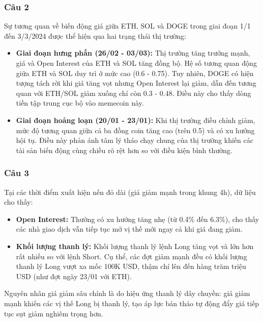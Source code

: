 \subsubsection{Câu 2}
Sự tương quan về biến động giá giữa ETH, SOL và DOGE trong giai đoạn 1/1 đến 3/3/2024 được thể hiện qua hai trạng thái thị trường:
\begin{itemize}
    \item \textbf{Giai đoạn hưng phấn (26/02 - 03/03):} Thị trường tăng trưởng mạnh, giá và Open Interest của ETH và SOL tăng đồng bộ. Hệ số tương quan động giữa ETH và SOL duy trì ở mức cao (0.6 - 0.75). Tuy nhiên, DOGE có hiện tượng tách rời khi giá tăng vọt nhưng Open Interest lại giảm, dẫn đến tương quan với ETH/SOL giảm xuống chỉ còn 0.3 - 0.48. Điều này cho thấy dòng tiền tập trung cục bộ vào memecoin này.
    \item \textbf{Giai đoạn hoảng loạn (20/01 - 23/01):} Khi thị trường điều chỉnh giảm, mức độ tương quan giữa cả ba đồng coin tăng cao (trên 0.5) và có xu hướng hội tụ. Điều này phản ánh tâm lý tháo chạy chung của thị trường khiến các tài sản biến động cùng chiều rõ rệt hơn so với điều kiện bình thường.
\end{itemize}

\subsubsection{Câu 3}
Tại các thời điểm xuất hiện nến đỏ dài (giá giảm mạnh trong khung 4h), dữ liệu cho thấy:
\begin{itemize}
    \item \textbf{Open Interest:} Thường có xu hướng tăng nhẹ (từ 0.4\% đến 6.3\%), cho thấy các nhà giao dịch vẫn tiếp tục mở vị thế mới ngay cả khi giá đang giảm.
    \item \textbf{Khối lượng thanh lý:} Khối lượng thanh lý lệnh Long tăng vọt và lớn hơn rất nhiều so với lệnh Short. Cụ thể, các đợt giảm mạnh đều có khối lượng thanh lý Long vượt xa mốc 100K USD, thậm chí lên đến hàng trăm triệu USD (như đợt ngày 23/01 với ETH).
\end{itemize}
Nguyên nhân giá giảm sâu chính là do hiệu ứng thanh lý dây chuyền: giá giảm mạnh khiến các vị thế Long bị thanh lý, tạo áp lực bán tháo tự động đẩy giá tiếp tục sụt giảm nghiêm trọng hơn.

